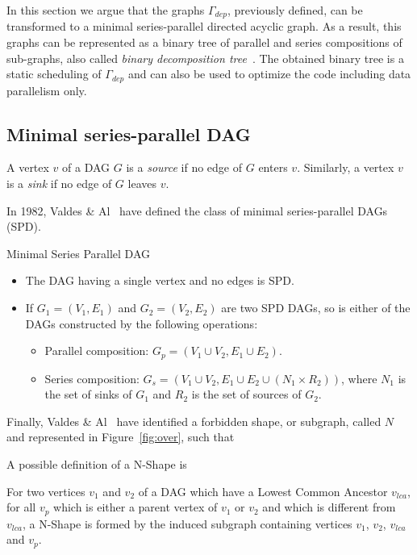 In this section we argue that the graphs $\Gamma_{dep}$, previously defined, can be transformed to a minimal series-parallel directed acyclic graph. As a result, this graphs can be represented as a binary tree of parallel and series compositions of sub-graphs, also called \emph{binary decomposition tree}~\cite{Valdes:1979:RSP:800135.804393}. The obtained binary tree is a static scheduling of $\Gamma_{dep}$ and can also be used to optimize the code including data parallelism only.

\subsection{Minimal series-parallel DAG}
\begin{mydef}
A vertex $v$ of a DAG $G$ is a \emph{source} if no edge of $G$ enters $v$. Similarly, a vertex $v$ is a \emph{sink} if no edge of $G$ leaves $v$. 
\end{mydef}

In 1982, Valdes \& Al~\cite{Valdes:1979:RSP:800135.804393} have defined the class of minimal series-parallel DAGs (SPD).

\begin{mydef}Minimal Series Parallel DAG
\begin{itemize}
\item The DAG having a single vertex and no edges is SPD.
\item If $G_1=(V_1,E_1)$ and $G_2=(V_2,E_2)$ are two SPD DAGs, so is either of the DAGs constructed by the following operations:
\begin{itemize}
\item Parallel composition: $G_p=(V_1\cup V_2,E_1\cup E_2)$.
\item Series composition: $G_s=(V_1\cup V_2,E_1\cup E_2\cup (N_1 \times R_2))$, where $N_1$ is the set of sinks of $G_1$ and $R_2$ is the set of sources of $G_2$.
\end{itemize}
\end{itemize}
\end{mydef}

Finally, Valdes \& Al~\cite{Valdes:1979:RSP:800135.804393} have identified a forbidden shape, or subgraph, called $N$ and represented in Figure~\ref{fig:over}, such that 

A possible definition of a N-Shape is
\begin{mydef}
For two vertices $v_1$ and $v_2$ of a DAG which have a Lowest Common Ancestor $v_{lca}$, for all $v_p$ which is either a parent vertex of $v_1$ or $v_2$ and which is different from $v_{lca}$, a N-Shape is formed by the induced subgraph containing vertices $v_1$, $v_2$, $v_{lca}$ and $v_p$.
\end{mydef}

